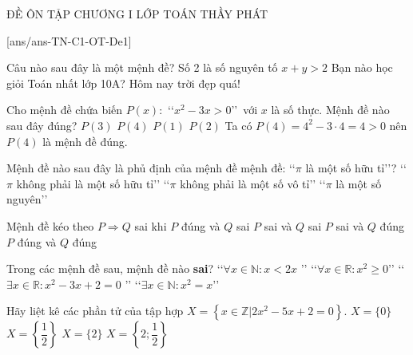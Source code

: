 \begin{name}
	{\tenchude}
	{ĐỀ ÔN TẬP CHƯƠNG I}
	{LỚP TOÁN THẦY PHÁT}
	{\thoigian}
\end{name}
\TN
\setcounter{ex}{0}
[ans/ans-TN-C1-OT-De1]

\begin{ex}%
	Câu nào sau đây là một mệnh đề?
	\choice
	{\True Số 2 là số nguyên tố}
	{$x+y>2$}
	{Bạn nào học giỏi Toán nhất lớp 10A?}
	{Hôm nay trời đẹp quá!}
\end{ex}

\begin{ex}%
	Cho mệnh đề chứa biến $P(x)\colon$ \lq\lq $x^{2}-3x>0$\rq\rq\ với $x$ là số thực. Mệnh đề nào sau đây đúng?
	\choice
	{$P(3)$}
	{\True $P(4)$}
	{$P(1)$}
	{$P(2)$}
	\loigiai
	{
		Ta có $P(4)=4^2-3\cdot4=4>0$ nên $P(4)$ là mệnh đề đúng.
	}
\end{ex}

\begin{ex}%
	Mệnh đề nào sau đây là phủ định của mệnh đề mệnh đề: \lq\lq $\pi$ là một số hữu tỉ\rq\rq?
	{\True\lq\lq $\pi$ không phải là một số hữu tỉ\rq\rq}
	{\lq\lq $\pi$ không phải là một số vô tỉ\rq\rq}
	{\lq\lq $\pi$ là một số nguyên\rq\rq}
\end{ex}
\begin{ex}%
	Mệnh đề kéo theo $P \Rightarrow Q$ sai khi
	\choice
	{\True $P$ đúng và $Q$ sai}
	{$P$ sai và $Q$ sai}
	{$P$ sai và $Q$ đúng}
	{$P$ đúng và $Q$ đúng}
\end{ex}

\begin{ex}%
	Trong các mệnh đề sau, mệnh đề nào \textbf{sai}?
	\choice
	{\True \lq\lq $\forall x \in \mathbb{N}: x<2 x $ \rq\rq}
	{\lq\lq $\forall x \in \mathbb{R}: x^2 \geq 0 $\rq\rq}
	{\lq\lq $\exists x \in \mathbb{R}: x^2-3 x+2=0$ \rq\rq}
	{\lq\lq $\exists x \in \mathbb{N}: x^2=x$\rq\rq}
\end{ex}

\begin{ex}%
	Hãy liệt kê các phần tử của tập hợp $X=\left\{x \in \mathbb{Z} | 2 x^{2}-5 x+2=0\right\}$.
	\choice
	{$X=\{0\}$}
	{$X=\left\{\dfrac{1}{2}\right\}$}
	{\True $X=\{2\}$}
	{$X=\left\{2 ; \dfrac{1}{2}\right\}$}
\end{ex}

